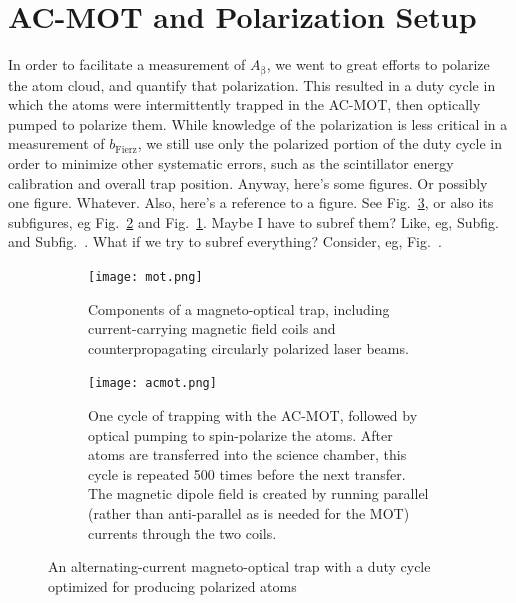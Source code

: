 \section{AC-MOT and Polarization Setup}
	In order to facilitate a measurement of $A_{\mathrm{\beta}}$, we went to great efforts to polarize the atom cloud, and quantify that polarization.  This resulted in a duty cycle in which the atoms were intermittently trapped in the AC-MOT, then optically pumped to polarize them.  While knowledge of the polarization is less critical in a measurement of $b_{\mathrm{Fierz}}$, we still use only the polarized portion of the duty cycle in order to minimize other systematic errors, such as the scintillator energy calibration and overall trap position.
	Anyway, here's some figures.  Or possibly one figure.  Whatever.  Also, here's a reference to a figure.  See Fig.~\ref*{fig:themot}, or also its subfigures, eg Fig.~\ref{fig:acmot} and Fig.~\ref{fig:mot}.  Maybe I have to subref them?  Like, eg, Subfig.~ and Subfig.~.  What if we try to subref everything?  Consider, eg, Fig.~.
	

	\begin{figure}[ht]
	\centering
		\begin{subfigure}[t]{0.242\textwidth}
			\centering
			\texttt{[image: mot.png]}
			\caption{\color{oldcolor} Components of a magneto-optical trap, including current-carrying magnetic field coils and counterpropagating circularly polarized laser beams.}
			\label{fig:mot}
		\end{subfigure}
		\hfill
		\begin{subfigure}[t]{0.728\textwidth}
			\centering
			\texttt{[image: acmot.png]}
			\caption{\color{oldcolor}One cycle of trapping with the AC-MOT, followed by optical pumping to spin-polarize the atoms.  After atoms are transferred into the science chamber, this cycle is repeated 500 times before the next transfer.  The magnetic dipole field is created by running parallel (rather than anti-parallel as is needed for the MOT) currents through the two coils.}
			\label{fig:acmot}
		\end{subfigure}
		\caption{\color{oldcolor}An alternating-current magneto-optical trap with a duty cycle optimized for producing polarized atoms}	
		\label{fig:themot}
	\color{black}
	\end{figure}
	
